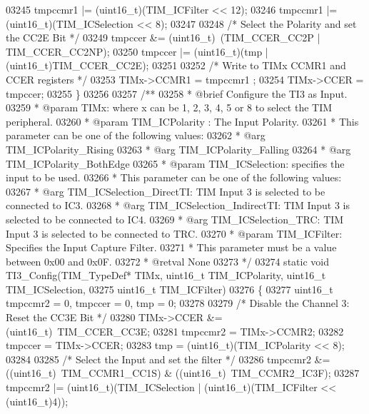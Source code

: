 \begin{DoxyCode}
03245   tmpccmr1 |= (uint16\_t)(TIM\_ICFilter << 12);
03246   tmpccmr1 |= (uint16\_t)(TIM\_ICSelection << 8);
03247 
03248   \textcolor{comment}{/* Select the Polarity and set the CC2E Bit */}
03249   tmpccer &= (uint16\_t)~(TIM_CCER_CC2P | TIM_CCER_CC2NP);
03250   tmpccer |=  (uint16\_t)(tmp | (uint16\_t)TIM_CCER_CC2E);
03251 
03252   \textcolor{comment}{/* Write to TIMx CCMR1 and CCER registers */}
03253   TIMx->CCMR1 = tmpccmr1 ;
03254   TIMx->CCER = tmpccer;
03255 \}
03256 
03257 \textcolor{comment}{/**}
03258 \textcolor{comment}{  * @brief  Configure the TI3 as Input.}
03259 \textcolor{comment}{  * @param  TIMx: where x can be 1, 2, 3, 4, 5 or 8 to select the TIM peripheral.}
03260 \textcolor{comment}{  * @param  TIM\_ICPolarity : The Input Polarity.}
03261 \textcolor{comment}{  *          This parameter can be one of the following values:}
03262 \textcolor{comment}{  *            @arg TIM\_ICPolarity\_Rising}
03263 \textcolor{comment}{  *            @arg TIM\_ICPolarity\_Falling}
03264 \textcolor{comment}{  *            @arg TIM\_ICPolarity\_BothEdge         }
03265 \textcolor{comment}{  * @param  TIM\_ICSelection: specifies the input to be used.}
03266 \textcolor{comment}{  *          This parameter can be one of the following values:}
03267 \textcolor{comment}{  *            @arg TIM\_ICSelection\_DirectTI: TIM Input 3 is selected to be connected to IC3.}
03268 \textcolor{comment}{  *            @arg TIM\_ICSelection\_IndirectTI: TIM Input 3 is selected to be connected to IC4.}
03269 \textcolor{comment}{  *            @arg TIM\_ICSelection\_TRC: TIM Input 3 is selected to be connected to TRC.}
03270 \textcolor{comment}{  * @param  TIM\_ICFilter: Specifies the Input Capture Filter.}
03271 \textcolor{comment}{  *          This parameter must be a value between 0x00 and 0x0F.}
03272 \textcolor{comment}{  * @retval None}
03273 \textcolor{comment}{  */}
03274 \textcolor{keyword}{static} \textcolor{keywordtype}{void} TI3_Config(TIM\_TypeDef* TIMx, uint16\_t TIM\_ICPolarity, uint16\_t TIM\_ICSelection,
03275                        uint16\_t TIM\_ICFilter)
03276 \{
03277   uint16\_t tmpccmr2 = 0, tmpccer = 0, tmp = 0;
03278 
03279   \textcolor{comment}{/* Disable the Channel 3: Reset the CC3E Bit */}
03280   TIMx->CCER &= (uint16\_t)~TIM_CCER_CC3E;
03281   tmpccmr2 = TIMx->CCMR2;
03282   tmpccer = TIMx->CCER;
03283   tmp = (uint16\_t)(TIM\_ICPolarity << 8);
03284 
03285   \textcolor{comment}{/* Select the Input and set the filter */}
03286   tmpccmr2 &= ((uint16\_t)~TIM_CCMR1_CC1S) & ((uint16\_t)~TIM_CCMR2_IC3F);
03287   tmpccmr2 |= (uint16\_t)(TIM\_ICSelection | (uint16\_t)(TIM\_ICFilter << (uint16\_t)4));

\end{DoxyCode}
